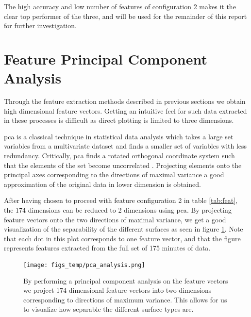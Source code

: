 The high accuracy and low number of features of configuration 2 makes it the clear top performer of the three, and will be used for the remainder of this report for further investigation.

\section{Feature Principal Component Analysis}

Through the feature extraction methods described in previous sections we obtain high dimensional feature vectors. Getting an intuitive feel for such data extracted in these processes is difficult as direct plotting is limited to three dimensions. 

\gls{pca} is  a classical technique in statistical data analysis which takes a large set variables from a multivariate dataset and finds a smaller set of variables with less redundancy. Critically, \gls{pca} finds a rotated orthogonal coordinate system such that the elements of the set become uncorrelated \citep{hyvasrinen_karhunen_oja_2004}. Projecting elements onto the principal axes corresponding to the directions of maximal variance a good approximation of the original data in lower dimension is obtained.

After having chosen to proceed with feature configuration 2 in table \ref{tab:feat}, the 174 dimensions can be reduced to 2 dimensions using \gls{pca}. By projecting feature vectors onto the two directions of maximal variance, we get a good visualization of the separability of the different surfaces as seen in figure \ref{fig:pca}. Note that each dot in this plot corresponds to one feature vector, and that the figure represents features extracted from the full set of 175 minutes of data.  

\begin{figure}[h]
	\centering
	\texttt{[image: figs\_temp/pca\_analysis.png]}
	\caption{By performing a principal component analysis on the feature vectors we project 174 dimensional feature vectors into two dimensions corresponding to directions of maximum variance. This allows for us to visualize how separable the different surface types are.}
	\label{fig:pca}
\end{figure}

